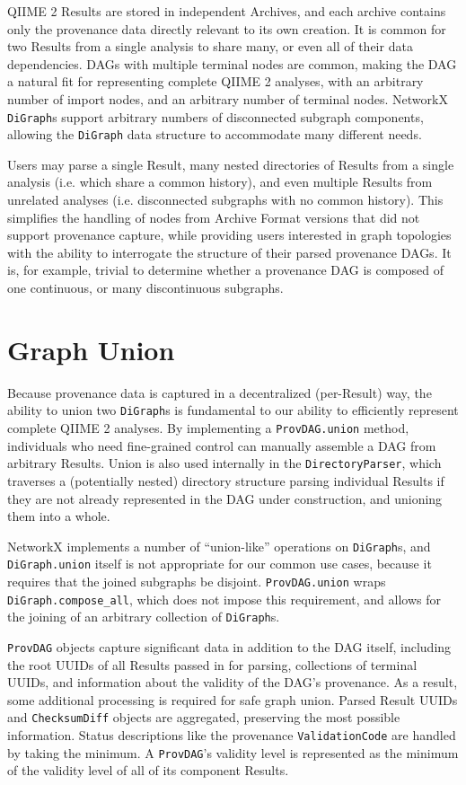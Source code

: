 QIIME 2 Results are stored in independent Archives, and each archive contains
only the provenance data directly relevant to its own creation. It is common for
two Results from a single analysis to share many, or even all of their data
dependencies. DAGs with multiple terminal nodes are common, making the DAG a
natural fit for representing complete QIIME 2 analyses, with an arbitrary number
of import nodes, and an arbitrary number of terminal nodes. NetworkX \texttt{DiGraph}s
support arbitrary numbers of disconnected subgraph components, allowing the
\texttt{DiGraph} data structure to accommodate many different needs.

Users may parse a single Result, many nested directories of Results from a
single analysis (i.e. which share a common history), and even multiple Results
from unrelated analyses (i.e. disconnected subgraphs with no common history).
This simplifies the handling of nodes from Archive Format versions that did not
support provenance capture, while providing users interested in graph topologies
with the ability to interrogate the structure of their parsed provenance DAGs.
It is, for example, trivial to determine whether a provenance DAG is composed of
one continuous, or many discontinuous subgraphs.


\section{Graph Union}

Because provenance data is captured in a decentralized (per-Result) way, the
ability to union two \texttt{DiGraph}s is fundamental to our ability to efficiently
represent complete QIIME 2 analyses. By implementing a \texttt{ProvDAG.union} method,
individuals who need fine-grained control can manually assemble a DAG from
arbitrary Results. Union is also used internally in the \texttt{DirectoryParser}, which
traverses a (potentially nested) directory structure parsing individual Results
if they are not already represented in the DAG under construction, and unioning
them into a whole.

NetworkX implements a number of “union-like” operations on \texttt{DiGraph}s, and
\texttt{DiGraph.union} itself is not appropriate for our common use cases, because it
requires that the joined subgraphs be disjoint. \texttt{ProvDAG.union} wraps
\texttt{DiGraph.compose\_all}, which does not impose this requirement, and allows for the
joining of an arbitrary collection of \texttt{DiGraph}s.

\texttt{ProvDAG} objects capture significant data in addition to the DAG itself,
including the root UUIDs of all Results passed in for parsing, collections of
terminal UUIDs, and information about the validity of the DAG’s provenance. As a
result, some additional processing is required for safe graph union. Parsed
Result UUIDs and \texttt{ChecksumDiff} objects are aggregated, preserving the most
possible information. Status descriptions like the provenance \texttt{ValidationCode} are
handled by taking the minimum. A \texttt{ProvDAG}'s validity level is represented as the
minimum of the validity level of all of its component Results.


